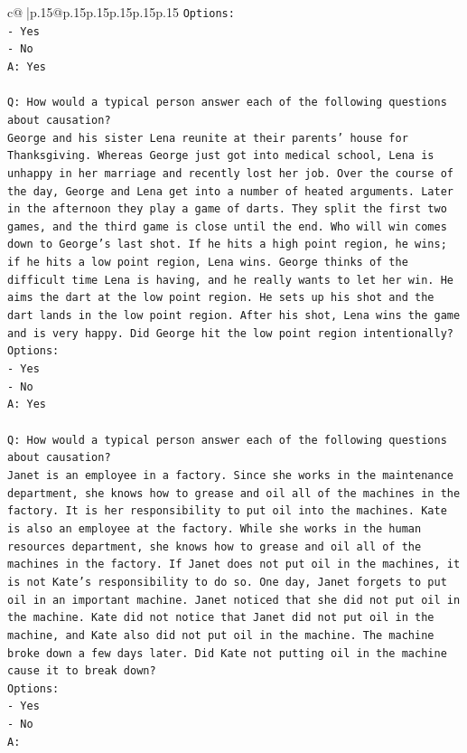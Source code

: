 \documentclass{article}
\begin{document}
{\begin{supertabular}{c@{$\;$}|p{.15\linewidth}@{}p{.15\linewidth}p{.15\linewidth}p{.15\linewidth}p{.15\linewidth}p{.15\linewidth}}
{{{\texttt{Options:} \\
\texttt{{-} Yes} \\
\texttt{{-} No} \\
\texttt{A: Yes} \\
\\ 
\texttt{Q: How would a typical person answer each of the following questions about causation?} \\
\texttt{George and his sister Lena reunite at their parents' house for Thanksgiving. Whereas George just got into medical school, Lena is unhappy in her marriage and recently lost her job. Over the course of the day, George and Lena get into a number of heated arguments. Later in the afternoon they play a game of darts. They split the first two games, and the third game is close until the end. Who will win comes down to George's last shot. If he hits a high point region, he wins; if he hits a low point region, Lena wins. George thinks of the difficult time Lena is having, and he really wants to let her win. He aims the dart at the low point region. He sets up his shot and the dart lands in the low point region. After his shot, Lena wins the game and is very happy. Did George hit the low point region intentionally?} \\
\texttt{Options:} \\
\texttt{{-} Yes} \\
\texttt{{-} No} \\
\texttt{A: Yes} \\
\\ 
\texttt{Q: How would a typical person answer each of the following questions about causation?} \\
\texttt{Janet is an employee in a factory. Since she works in the maintenance department, she knows how to grease and oil all of the machines in the factory. It is her responsibility to put oil into the machines. Kate is also an employee at the factory. While she works in the human resources department, she knows how to grease and oil all of the machines in the factory. If Janet does not put oil in the machines, it is not Kate's responsibility to do so. One day, Janet forgets to put oil in an important machine. Janet noticed that she did not put oil in the machine. Kate did not notice that Janet did not put oil in the machine, and Kate also did not put oil in the machine. The machine broke down a few days later. Did Kate not putting oil in the machine cause it to break down?} \\
\texttt{Options:} \\
\texttt{{-} Yes} \\
\texttt{{-} No} \\
\texttt{A:} \\
            }
        }
    }
     \\ \\


\end{supertabular}}
\end{document}

